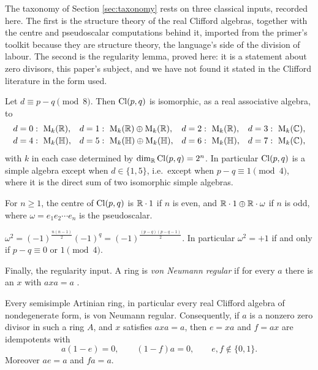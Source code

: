 The taxonomy of Section \ref{sec:taxonomy} rests on three classical inputs, recorded here. The first is the structure theory of the real Clifford algebras, together with the centre and pseudoscalar computations behind it, imported from the primer's toolkit because they are structure theory, the language's side of the division of labour. The second is the regularity lemma, proved here: it is a statement about zero divisors, this paper's subject, and we have not found it stated in the Clifford literature in the form used.

\begin{theorem}\label{thm:classification}
Let $d \equiv p - q \pmod 8$. Then $\mathrm{Cl}(p,q)$ is isomorphic, as a real associative algebra, to
\[
\begin{array}{llll}
d = 0:\ \mathrm{M}_{k}(\mathbb{R}), &
d = 1:\ \mathrm{M}_{k}(\mathbb{R}) \oplus \mathrm{M}_{k}(\mathbb{R}), &
d = 2:\ \mathrm{M}_{k}(\mathbb{R}), &
d = 3:\ \mathrm{M}_{k}(\mathbb{C}), \\[2pt]
d = 4:\ \mathrm{M}_{k}(\mathbb{H}), &
d = 5:\ \mathrm{M}_{k}(\mathbb{H}) \oplus \mathrm{M}_{k}(\mathbb{H}), &
d = 6:\ \mathrm{M}_{k}(\mathbb{H}), &
d = 7:\ \mathrm{M}_{k}(\mathbb{C}),
\end{array}
\]
with $k$ in each case determined by $\dim_{\mathbb{R}} \mathrm{Cl}(p,q) = 2^n$. In particular $\mathrm{Cl}(p,q)$ is a simple algebra except when $d \in \{1, 5\}$, i.e.\ except when $p - q \equiv 1 \pmod 4$, where it is the direct sum of two isomorphic simple algebras.
\end{theorem}

\begin{lemma}\label{lem:center}
For $n \geq 1$, the centre of $\mathrm{Cl}(p,q)$ is $\mathbb{R} \cdot 1$ if $n$ is even, and $\mathbb{R} \cdot 1 \oplus \mathbb{R} \cdot \omega$ if $n$ is odd, where $\omega = e_1 e_2 \cdots e_n$ is the pseudoscalar.
\end{lemma}

\begin{lemma}\label{lem:omegasq}
$\displaystyle \omega^2 = (-1)^{\tfrac{n(n-1)}{2}} (-1)^q = (-1)^{\tfrac{(p-q)(p-q-1)}{2}}$. In particular $\omega^2 = +1$ if and only if $p - q \equiv 0$ or $1 \pmod 4$.
\end{lemma}

Finally, the regularity input. A ring is \emph{von Neumann regular} if for every $a$ there is an $x$ with $axa = a$ \cite{vonNeumann1936}.

\begin{lemma}\label{lem:regular}
Every semisimple Artinian ring, in particular every real Clifford algebra of nondegenerate form, is von Neumann regular. Consequently, if $a$ is a nonzero zero divisor in such a ring $A$, and $x$ satisfies $axa = a$, then $e = xa$ and $f = ax$ are idempotents with
\[
a(1 - e) = 0, \qquad (1 - f)a = 0, \qquad e, f \notin \{0, 1\}.
\]
Moreover $ae = a$ and $fa = a$.
\end{lemma}

